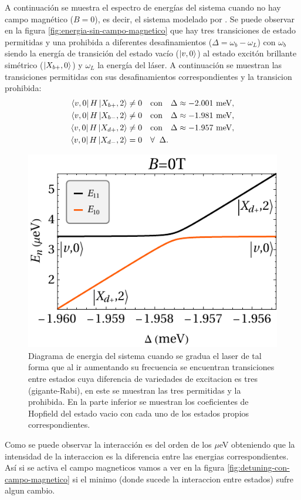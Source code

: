 \documentclass[../main.tex]{subfiles}
\begin{document}
A continuaci\'on se muestra el espectro de energ\'ias del sistema cuando no hay campo magn\'etico ($B=0$), es decir, el sistema modelado por \cite{Vargas2022}. Se puede observar en la figura \ref{fig:energia-sin-campo-magnetico} que hay tres transiciones de estado permitidas y una prohibida a diferentes desafinamientos ($\Delta = \omega_b-\omega_L$) con $\omega_b$ siendo la energ\'ia de transici\'on del estado vac\'io ($\ket{v,0}$) al estado excit\'on brillante sim\'etrico ($\ket{X_{b+},0}$) y $\omega_L$ la energ\'ia del l\'aser. A continuaci\'on se muestran las transiciones permitidas con sus desafinamientos correspondientes y la transicion prohibida:
\begin{align}
	\bra{v,0}H\ket{X_{b+},2} &\neq 0 \quad \text{con} \quad \Delta \approx -2.001 \text{ meV},\\
	\bra{v,0}H\ket{X_{b-},2} &\neq 0 \quad \text{con} \quad \Delta \approx -1.981 \text{ meV},\\
	\bra{v,0}H\ket{X_{d+},2} &\neq 0 \quad \text{con} \quad \Delta \approx -1.957 \text{ meV},\\
	\bra{v,0}H\ket{X_{d-},2} &= 0 \quad \forall \;\; \Delta.
\end{align}

\begin{figure}[bh]
	\centering
	\includegraphics[width=.5\linewidth]{../res/E11E10_B0}
	\caption{Diagrama de energia del sistema cuando se gradua el laser de tal forma que al ir aumentando su frecuencia se encuentran transiciones entre estados cuya diferencia de variedades de excitacion es tres (gigante-Rabi), en este se muestran las tres permitidas y la prohibida. En la parte inferior se muestran los coeficientes de Hopfield del estado vacio con cada uno de los estados propios correspondientes.}
	\label{fig:E11E10_B0}
\end{figure}

Como se puede observar la interacci\'on es del orden de los $\mu$eV obteniendo que la intensidad de la interaccion es la diferencia entre las energias correspondientes. As\'i si se activa el campo magneticos vamos a ver en la figura \ref{fig:detuning-con-campo-magnetico} si el minimo (donde sucede la interaccion entre estados) sufre algun cambio.
\end{document}
